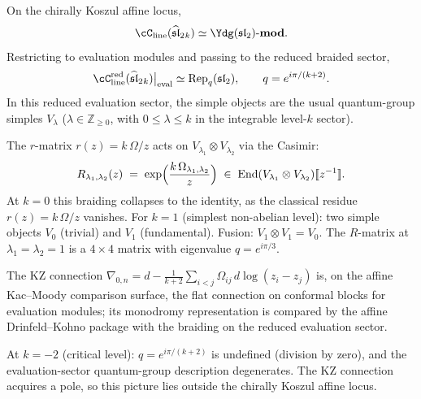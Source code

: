 \begin{computation}
\label{comp:line-op-sl2}
On the chirally Koszul affine locus,
\[
\cC_{\mathrm{line}}(\widehat{\mathfrak{sl}}_2{}_k)
\simeq \Ydg(\mathfrak{sl}_2)\text{-}\mathbf{mod}.
\]
Restricting to evaluation modules and passing to the reduced braided
sector,
\[
\cC_{\mathrm{line}}^{\mathrm{red}}(\widehat{\mathfrak{sl}}_2{}_k)
\big|_{\mathrm{eval}}
\simeq \operatorname{Rep}_q(\mathfrak{sl}_2),
\qquad q=e^{i\pi/(k+2)}.
\]
In this reduced evaluation sector, the simple objects are the usual
quantum-group simples $V_\lambda$ ($\lambda\in\mathbb Z_{\ge 0}$,
with $0\le \lambda\le k$ in the integrable level-$k$ sector).

The $r$-matrix $r(z)=k\,\Omega/z$ acts on
$V_{\lambda_1}\otimes V_{\lambda_2}$ via the Casimir:
\[
R_{\lambda_1,\lambda_2}(z)
\;=\;
\exp\Bigl(\frac{k\,\Omega_{\lambda_1,\lambda_2}}{z}\Bigr)
\;\in\;
\operatorname{End}(V_{\lambda_1}\otimes V_{\lambda_2})
[\![z^{-1}]\!].
\]
At $k=0$ this braiding collapses to the identity, as the
classical residue $r(z)=k\,\Omega/z$ vanishes.
For $k=1$ (simplest non-abelian level): two simple objects
$V_0$ (trivial) and $V_1$ (fundamental). Fusion:
$V_1\otimes V_1=V_0$. The $R$-matrix at $\lambda_1=\lambda_2=1$
is a $4\times 4$ matrix with eigenvalue $q=e^{i\pi/3}$.

The KZ connection
$\nabla_{0,n}=d-\frac{1}{k+2}\sum_{i<j}\Omega_{ij}\,
d\log(z_i-z_j)$
is, on the affine Kac--Moody comparison surface, the flat
connection on conformal blocks for evaluation modules; its
monodromy representation is compared by the affine
Drinfeld--Kohno package with the braiding on the reduced
evaluation sector.

At $k=-2$ (critical level): $q=e^{i\pi/(k+2)}$ is undefined
(division by zero), and the evaluation-sector quantum-group
description degenerates. The KZ connection acquires a pole,
so this picture lies outside the chirally Koszul affine locus.
\end{computation}

